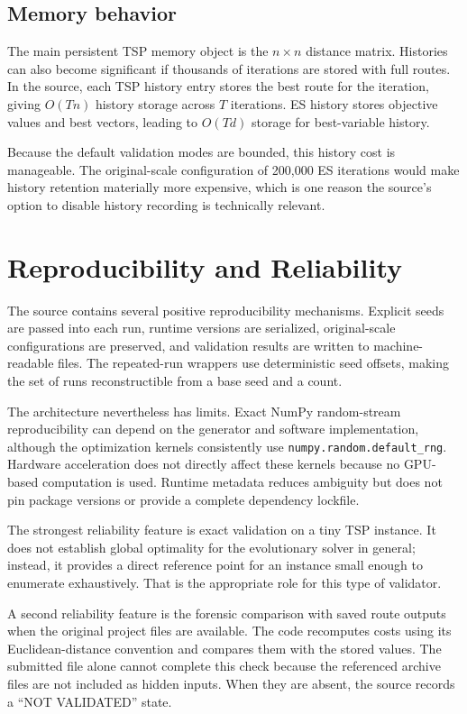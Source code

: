\documentclass[11pt,a4paper]{article}
\newcommand{\code}[1]{\texttt{#1}}
\begin{document}
\subsection{Memory behavior}
The main persistent TSP memory object is the $n\times n$ distance matrix. Histories can also become significant if thousands of iterations are stored with full routes. In the source, each TSP history entry stores the best route for the iteration, giving $O(Tn)$ history storage across $T$ iterations. ES history stores objective values and best vectors, leading to $O(Td)$ storage for best-variable history.

Because the default validation modes are bounded, this history cost is manageable. The original-scale configuration of 200,000 ES iterations would make history retention materially more expensive, which is one reason the source's option to disable history recording is technically relevant.

\section{Reproducibility and Reliability}
The source contains several positive reproducibility mechanisms. Explicit seeds are passed into each run, runtime versions are serialized, original-scale configurations are preserved, and validation results are written to machine-readable files. The repeated-run wrappers use deterministic seed offsets, making the set of runs reconstructible from a base seed and a count.

The architecture nevertheless has limits. Exact NumPy random-stream reproducibility can depend on the generator and software implementation, although the optimization kernels consistently use \code{numpy.random.default\_rng}. Hardware acceleration does not directly affect these kernels because no GPU-based computation is used. Runtime metadata reduces ambiguity but does not pin package versions or provide a complete dependency lockfile.

The strongest reliability feature is exact validation on a tiny TSP instance. It does not establish global optimality for the evolutionary solver in general; instead, it provides a direct reference point for an instance small enough to enumerate exhaustively. That is the appropriate role for this type of validator.

A second reliability feature is the forensic comparison with saved route outputs when the original project files are available. The code recomputes costs using its Euclidean-distance convention and compares them with the stored values. The submitted file alone cannot complete this check because the referenced archive files are not included as hidden inputs. When they are absent, the source records a ``NOT VALIDATED'' state.
\end{document}
